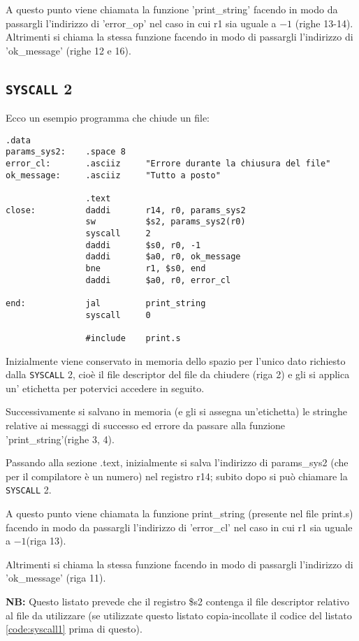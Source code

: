 \documentclass[12pt]{report}
\newcommand{\SC}{\texttt{SYSCALL}}
\newcommand{\OF}{\textbf{NB:} Questo listato prevede che il registro \$s2 contenga il file descriptor
relativo al file da utilizzare (se utilizzate questo listato copia-incollate il codice del listato \ref{code:syscall1} prima di questo).}
\begin{document}
A questo punto viene chiamata la funzione 'print\_string' facendo in modo
da passargli l'indirizzo di 'error\_op' nel caso in cui r1 sia uguale a $-1$
(righe 13-14).  Altrimenti si chiama la stessa funzione facendo in modo di
passargli l'indirizzo di 'ok\_message' (righe 12 e 16).

\subsection{\SC{} 2}
Ecco un esempio programma che chiude un file:
\begin{lstlisting}[caption={Esempio \SC{} 2}, label={code:syscall2}, style={mips}]
                .data
params_sys2:    .space 8
error_cl:       .asciiz     "Errore durante la chiusura del file"
ok_message:     .asciiz     "Tutto a posto"

                .text
close:          daddi       r14, r0, params_sys2        
                sw          $s2, params_sys2(r0)    
                syscall     2            
                daddi       $s0, r0, -1        
                daddi       $a0, r0, ok_message            
                bne         r1, $s0, end            
                daddi       $a0, r0, error_cl

end:            jal         print_string
                syscall     0
    
                #include    print.s         
\end{lstlisting}
Inizialmente viene conservato in memoria dello spazio per l'unico dato richiesto
dalla \SC{} 2, cio\`e  il file descriptor del file da chiudere (riga 2) e gli si
applica un' etichetta per potervici accedere in seguito.
 
Successivamente si salvano in memoria (e gli si assegna un'etichetta) le
stringhe relative ai messaggi di successo ed errore da passare alla funzione
'print\_string'(righe 3, 4).

Passando alla sezione .text, inizialmente si salva l'indirizzo di params\_sys2
(che per il compilatore \`{e} un numero) nel registro r14; subito dopo si
pu\`{o} chiamare la \SC{} 2.

A questo punto viene chiamata la funzione print\_string (presente nel file
print.s) facendo in modo da passargli l'indirizzo di 'error\_cl' nel caso in cui
r1 sia uguale a $-1$(riga 13).

Altrimenti si chiama la stessa funzione facendo in modo di passargli l'indirizzo
di 'ok\_message' (riga 11).

\OF{}
\end{document}
